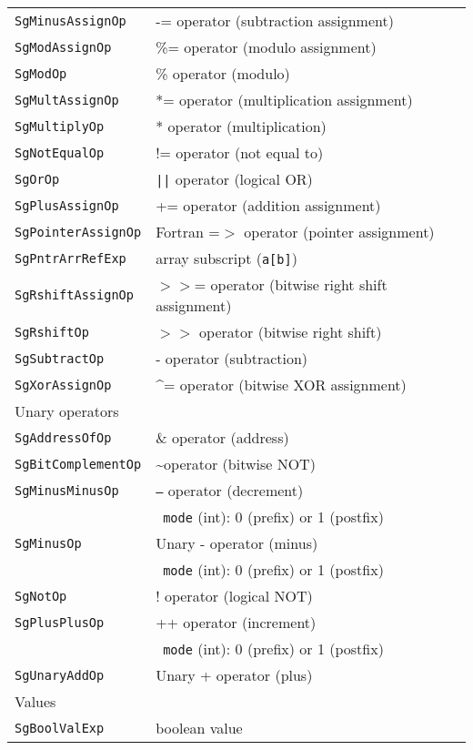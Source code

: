 \begin{longtable}[l]{l|p{10cm}}
 \texttt{SgMinusAssignOp} & -= operator (subtraction assignment) \\
 \texttt{SgModAssignOp} & \%= operator (modulo assignment)\\
 \texttt{SgModOp} & \% operator (modulo) \\
 \texttt{SgMultAssignOp} & *= operator (multiplication assignment)\\
 \texttt{SgMultiplyOp} & * operator (multiplication)\\
 \texttt{SgNotEqualOp} & != operator (not equal to)\\
 \texttt{SgOrOp} & \texttt{||} operator (logical OR)\\
 \texttt{SgPlusAssignOp} & += operator (addition assignment)\\
 \texttt{SgPointerAssignOp} & Fortran =$>$ operator (pointer assignment) \\
 \texttt{SgPntrArrRefExp} & array subscript (\texttt{a[b]})\\
 \texttt{SgRshiftAssignOp} & $>>$= operator (bitwise right shift assignment)\\
 \texttt{SgRshiftOp} & $>>$ operator (bitwise right shift)\\
 \texttt{SgSubtractOp} & - operator (subtraction)\\
 \texttt{SgXorAssignOp} & \^{}= operator (bitwise XOR assignment)\\
 \hline
 \multicolumn{2}{l}{Unary operators}\\
 \hline
 \texttt{SgAddressOfOp} & \& operator (address)\\
 \texttt{SgBitComplementOp} & \textasciitilde operator (bitwise NOT)\\
 \texttt{SgMinusMinusOp} & \texttt{--} operator (decrement)\\
 & ~\texttt{mode} (int): 0 (prefix) or 1 (postfix)\\
 \texttt{SgMinusOp} & Unary - operator (minus)\\
 & ~\texttt{mode} (int): 0 (prefix) or 1 (postfix)\\
 \texttt{SgNotOp} & ! operator (logical NOT)\\
 \texttt{SgPlusPlusOp} & ++ operator (increment)\\
 & ~\texttt{mode} (int): 0 (prefix) or 1 (postfix)\\
 \texttt{SgUnaryAddOp} & Unary + operator (plus)\\
 \hline
 \multicolumn{2}{l}{Values}\\
 \hline
 \texttt{SgBoolValExp}& boolean value \\

\end{longtable}
